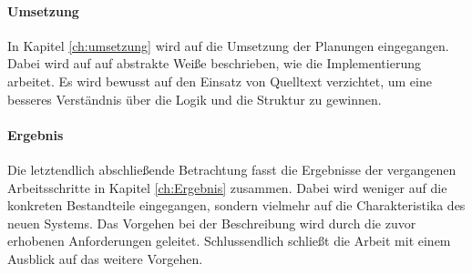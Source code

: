 \paragraph{Umsetzung} In Kapitel \ref{ch:umsetzung} wird auf die Umsetzung der Planungen eingegangen. Dabei wird auf auf abstrakte Weiße beschrieben, wie die Implementierung arbeitet. Es wird bewusst auf den Einsatz von Quelltext verzichtet, um eine besseres Verständnis über die Logik und die Struktur zu gewinnen. 

\paragraph{Ergebnis} Die letztendlich abschließende Betrachtung fasst die Ergebnisse der vergangenen Arbeitsschritte in Kapitel \ref{ch:Ergebnis} zusammen. Dabei wird weniger auf die konkreten Bestandteile eingegangen, sondern vielmehr auf die Charakteristika des neuen Systems. Das Vorgehen bei der Beschreibung wird durch die zuvor erhobenen Anforderungen geleitet. Schlussendlich schließt die Arbeit mit einem Ausblick auf das weitere Vorgehen. 

